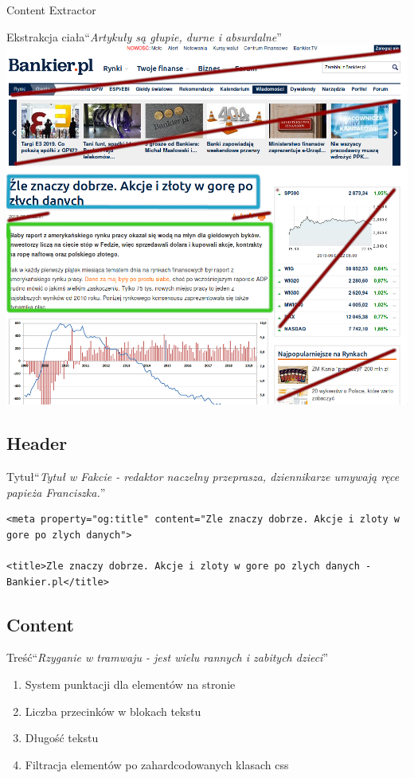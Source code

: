 \documentclass[14pt]{beamer}
\newcommand{\fakehead}[1]{``\textit{#1}''}
\begin{document}
\begin{section}{Content Extractor}
	\begin{frame}{Ekstrakcja ciała}{\fakehead{Artykuły są głupie, durne i absurdalne}}
		\centering
		\includegraphics[width=0.6\linewidth]{bankier.png}
	\end{frame}
	\subsection{Header}
	\begin{frame}[fragile]{Tytuł}{\fakehead{Tytuł w Fakcie - redaktor naczelny przeprasza, dziennikarze umywają ręce papieża Franciszka.}}
	\begin{lstlisting}
<meta property="og:title" content="Zle znaczy dobrze. Akcje i zloty w gore po zlych danych">

<title>Zle znaczy dobrze. Akcje i zloty w gore po zlych danych - Bankier.pl</title>
	\end{lstlisting}
	\end{frame}
	\subsection{Content}
	\begin{frame}[fragile]{Treść}{\fakehead{Rzyganie w tramwaju - jest wielu rannych i zabitych dzieci}}

		\begin{enumerate}
			\item System punktacji dla elementów na stronie
			\item Liczba przecinków w blokach tekstu
			\item Długość tekstu
			\item Filtracja elementów po zahardcodowanych klasach css
		\end{enumerate}
	\end{frame}
\end{section}
\end{document}
